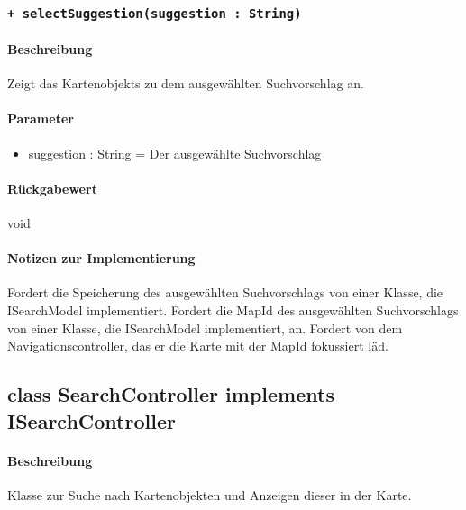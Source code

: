\subsubsection{\texttt{+ selectSuggestion(suggestion : String)}}%
\paragraph*{Beschreibung}
Zeigt das Kartenobjekts zu dem ausgewählten Suchvorschlag an.
\paragraph*{Parameter}
\begin{itemize}
    \item suggestion : String = Der ausgewählte Suchvorschlag
\end{itemize}
\paragraph*{Rückgabewert}
void
\paragraph*{Notizen zur Implementierung}
Fordert die Speicherung des ausgewählten Suchvorschlags von einer Klasse, die ISearchModel implementiert.
Fordert die MapId des ausgewählten Suchvorschlags von einer Klasse, die ISearchModel implementiert, an.
Fordert von dem Navigationscontroller, das er die Karte mit der MapId fokussiert läd.


\subsection{class SearchController implements ISearchController}
\paragraph*{Beschreibung}
Klasse zur Suche nach Kartenobjekten und Anzeigen dieser in der Karte.